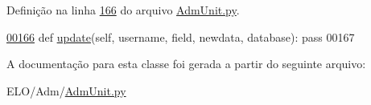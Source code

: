 Definição na linha \hyperlink{AdmUnit_8py_source_l00166}{166} do arquivo \hyperlink{AdmUnit_8py_source}{Adm\+Unit.\+py}.


\begin{DoxyCode}
\hypertarget{classAdm_1_1AdmUnit_1_1IfPersAdm_l00166}{}\hyperlink{classAdm_1_1AdmUnit_1_1IfPersAdm_a34acb7c8c60b0e90429cfbcc28424852}{00166}     \textcolor{keyword}{def }\hyperlink{classAdm_1_1AdmUnit_1_1IfPersAdm_a34acb7c8c60b0e90429cfbcc28424852}{update}(self, username, field, newdata, database): \textcolor{keyword}{pass}
00167 
\end{DoxyCode}


A documentação para esta classe foi gerada a partir do seguinte arquivo\+:\begin{DoxyCompactItemize}
\item 
E\+L\+O/\+Adm/\hyperlink{AdmUnit_8py}{Adm\+Unit.\+py}\end{DoxyCompactItemize}
